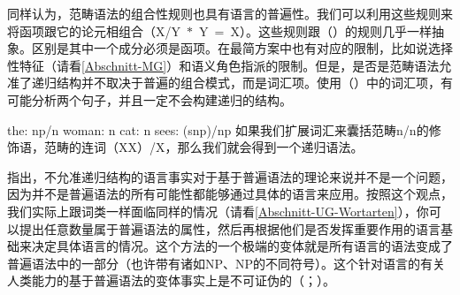 同样认为，范畴语法\indexcgc 的组合性规则也具有语言的普遍性。我们可以利用这些规则来将函项跟它的论元相组合（\mbox{X/Y $*$ Y = X}）。这些规则跟（）的规则几乎一样抽象。区别是其中一个成分必须是函项。在最简方案\indexmpc 中也有对应的限制，比如说选择性特征（请看\ref{Abschnitt-MG}）和语义角色指派的限制。但是，是否是范畴语法允准了递归结构并不取决于普遍的组合模式，而是词汇项。使用（）中的词汇项，有可能分析两个句子，并且一定不会构建递归的结构。

\eal
\ex the: np/n
\ex woman: n
\ex cat: n
\ex sees: (s\bs np)/np
\zl
如果我们扩展词汇来囊括范畴n/n的修饰语，范畴的连词（X\bs X）/X，那么我们就会得到一个递归语法。

 \citet*[]{FHC2005a}指出，不允准递归结构的语言事实对于基于普遍语法的理论来说并不是一个问题，因为并不是普遍语法的所有可能性都能够通过具体的语言来应用。按照这个观点，我们实际上跟词类一样面临同样的情况（请看\ref{Abschnitt-UG-Wortarten}），你可以提出任意数量属于普遍语法的属性，然后再根据他们是否发挥重要作用的语言基础来决定具体语言的情况。这个方法的一个极端的变体就是所有语言的语法变成了普遍语法中的一部分（也许带有诸如NP、NP的不同符号）。这个针对语言的有关人类能力的基于普遍语法的变体事实上是不可证伪的（\citealp[, 443]{EL2009a}；\citealp[]{Tomasello2009a}）。

